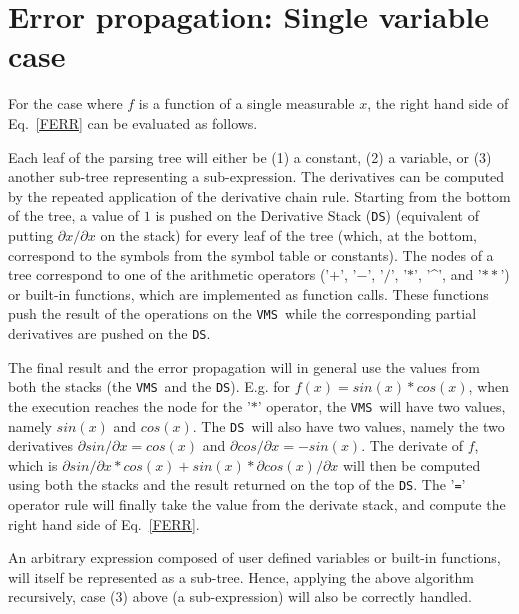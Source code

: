 \documentclass[acmtoms,acmnow]{acmtrans2m}
\newcommand{\DS}{{\tt DS}}
\newcommand{\VMS}{{\tt VMS}}
\begin{document}
\section{Error propagation: Single variable case}
\label{SEC:SINGLE_VAR}

For the case where $f$ is a function of a single measurable $x$, the
right hand side of Eq.~\ref{FERR} can be evaluated as follows.

Each leaf of the parsing tree will either be (1) a constant, (2) a
variable, or (3) another sub-tree representing a sub-expression.  The
derivatives can be computed by the repeated application of the
derivative chain rule.  Starting from the bottom of the tree, a value
of $1$ is pushed on the Derivative Stack (\DS) (equivalent of putting
$\partial x / \partial x$ on the stack) for every leaf of the tree
(which, at the bottom, correspond to the symbols from the symbol table
or constants).  The nodes of a tree correspond to one of the
arithmetic operators ('$+$', '$-$', '$/$', '$*$', '\^{}', and '$**$')
or built-in functions, which are implemented as function calls.  These
functions push the result of the operations on the \VMS\ while the
corresponding partial derivatives are pushed on the \DS.

The final result and the error propagation will in general use the
values from both the stacks (the \VMS\ and the \DS).  E.g. for
$f(x)=sin(x)*cos(x)$, when the execution reaches the node for the
'$*$' operator, the \VMS\ will have two values, namely $sin(x)$ and
$cos(x)$.  The \DS\ will also have two values, namely the two
derivatives $\partial sin / \partial x = cos(x)$ and $\partial cos /
\partial x = -sin(x)$.  The derivate of $f$, which is $\partial sin /
\partial x * cos(x) + sin(x) * \partial cos(x) / \partial x$ will then
be computed using both the stacks and the result returned on the top
of the \DS.  The '{\tt =}' operator rule will finally take the value
from the derivate stack, and compute the right hand side of
Eq.~\ref{FERR}.

An arbitrary expression composed of user defined variables or built-in
functions, will itself be represented as a sub-tree.  Hence, applying
the above algorithm recursively, case (3) above (a sub-expression)
will also be correctly handled.
\end{document}
